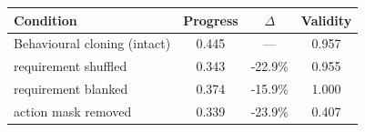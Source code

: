 \begin{tabular}{lccc}
\toprule
Condition & Progress & $\Delta$ & Validity \\
\midrule
Behavioural cloning (intact) & 0.445 & --- & 0.957 \\
\quad requirement shuffled & 0.343 & -22.9\% & 0.955 \\
\quad requirement blanked & 0.374 & -15.9\% & 1.000 \\
\quad action mask removed & 0.339 & -23.9\% & 0.407 \\
\bottomrule
\end{tabular}
